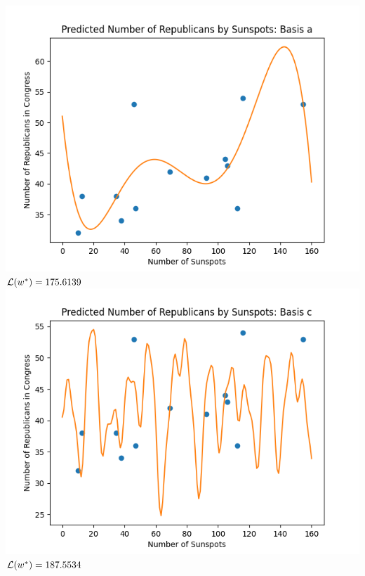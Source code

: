 \documentclass[submit]{harvardml}
\begin{document}
\includegraphics[scale=0.75]{sunspota.png} \\

\textbf{$\mathcal{L}(w^*) = 175.6139$} \\

\includegraphics[scale=0.75]{sunspotc.png}\\

\textbf{$\mathcal{L}(w^*) = 187.5534$} \\
\end{document}
